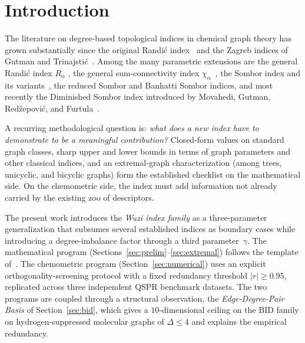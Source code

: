 \documentclass[11pt,a4paper]{article}
\theoremstyle{definition}
\begin{document}
\begin{abstract}
\medskip
\noindent\textbf{Keywords.} Topological index, bond-incident-degree
index, Randi\'c index, Sombor index, Wuzi index family,
QSPR, redundancy analysis, extremal graph.

\medskip
\noindent\textbf{Code and data.}
\url{https://github.com/Singati2/topological-index-orthogonality}
\end{abstract}

\section{Introduction}

The literature on degree-based topological indices in chemical
graph theory has grown substantially since the original
Randi\'c index~\cite{Randic1975} and the Zagreb indices of
Gutman and Trinajsti\'c~\cite{Gutman1972}. Among the many
parametric extensions are the general Randi\'c index $R_\alpha$
\cite{BollobasErdos1998}, the general sum-connectivity index
$\chi_\alpha$~\cite{ZhouTrinajstic2009sumconn}, the Sombor index and
its variants~\cite{Gutman2021Sombor}, the reduced Sombor and Banhatti
Sombor indices, and most recently the Diminished Sombor index
introduced by Movahedi, Gutman, Red\v{z}epovi\'c, and
Furtula~\cite{MovahediGutmanRedzepovicFurtula2026}.

A recurring methodological question is: \emph{what does a new index
have to demonstrate to be a meaningful contribution?} Closed-form
values on standard graph classes, sharp upper and lower bounds in
terms of graph parameters and other classical indices, and an
extremal-graph characterization (among trees, unicyclic, and
bicyclic graphs) form the established checklist on the
mathematical side. On the chemometric side, the index must add
information not already carried by the existing zoo of descriptors.

The present work introduces the \emph{Wuzi index family} as a
three-parameter generalization that subsumes several established
indices as boundary cases while introducing a degree-imbalance
factor through a third parameter~$\gamma$. The mathematical
program (Sections~\ref{sec:prelim}--\ref{sec:extremal}) follows the
template of~\cite{MovahediGutmanRedzepovicFurtula2026}. The
chemometric program (Section~\ref{sec:numerical}) uses an
explicit orthogonality-screening protocol with a fixed redundancy
threshold $|r|\ge 0.95$, replicated across three independent QSPR
benchmark datasets. The two programs are coupled through a
structural observation, the \emph{Edge-Degree-Pair Basis} of
Section~\ref{sec:bid}, which gives a $10$-dimensional ceiling on
the BID family on hydrogen-suppressed molecular graphs of
$\Delta\le 4$ and explains the empirical redundancy.
\end{document}
